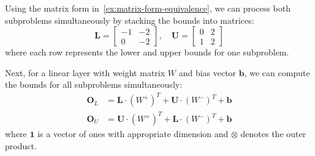 \documentclass[oneside,11pt,dvipsnames]{book}
\numberwithin{equation}{section}
\theoremstyle{definition}
\theoremstyle{remark}
\begin{document}
Using the matrix form in~\autoref{ex:matrix-form-equivalence}, we can process both subproblems simultaneously by stacking the bounds into matrices:
\[
\mathbf{L} = \begin{bmatrix} -1 & -2 \\ 0 & -2 \end{bmatrix}, \quad
\mathbf{U} = \begin{bmatrix} 0 & 2 \\ 1 & 2 \end{bmatrix}
\]
where each row represents the lower and upper bounds for one subproblem.

Next, for a linear layer with weight matrix $W$ and bias vector $\mathbf{b}$, we can compute the bounds for all subproblems simultaneously:
\[
\begin{aligned}
\mathbf{O}_L &= \mathbf{L} \cdot (W^+)^T + \mathbf{U} \cdot (W^-)^T + \mathbf{b}\\
\mathbf{O}_U &= \mathbf{U} \cdot (W^+)^T + \mathbf{L} \cdot (W^-)^T + \mathbf{b}
\end{aligned}
\]
where $\mathbf{1}$ is a vector of ones with appropriate dimension and $\otimes$ denotes the outer product.
\end{document}
